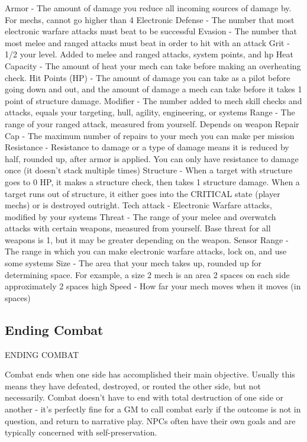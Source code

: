 Armor - The amount of damage you reduce all incoming sources of damage by. For mechs,  
cannot go higher than 4  
Electronic Defense - The number that most electronic warfare attacks must beat to be  
successful  
Evasion - The number that most melee and ranged attacks must beat in order to hit with an  
attack  
Grit - 1/2 your level. Added to melee and ranged attacks, system points, and hp  
Heat Capacity - The amount of heat your mech can take before making an overheating check.  
Hit Points (HP) - The amount of damage you can take as a pilot before going down and out, and  
the amount of damage a mech can take before it takes 1 point of structure damage.  
Modifier - The number added to mech skill checks and attacks, equals your targeting, hull, agility,  
engineering, or systems  
Range - The range of your ranged attack, measured from yourself. Depends on weapon  
Repair Cap - The maximum number of repairs to your mech you can make per mission  
Resistance - Resistance to damage or a type of damage means it is reduced by half, rounded up,  
after armor is applied. You can only have resistance to damage once (it doesn’t stack multiple  
times)  
Structure - When a target with structure goes to 0 HP, it makes a structure check, then takes 1  
structure damage. When a target runs out of structure, it either goes into the CRITICAL state  
(player mechs) or is destroyed outright.  
Tech attack - Electronic Warfare attacks, modified by your systems  
Threat - The range of your melee and overwatch attacks with certain weapons, measured from  
yourself. Base threat for all weapons is 1, but it may be greater depending on the weapon.  
Sensor Range - The range in which you can make electronic warfare attacks, lock on, and use  
some systems  
Size - The area that your mech takes up, rounded up for determining space. For example, a size  
2 mech is an area 2 spaces on each side approximately 2 spaces high  
Speed - How far your mech moves when it moves (in spaces)  

                                                                                                              
\subsection{Ending Combat}

                                           ENDING COMBAT
 

Combat ends when one side has accomplished their main objective. Usually this means they  
have defeated, destroyed, or routed the other side, but not necessarily. Combat doesn’t have to  
end with total destruction of one side or another - it’s perfectly fine for a GM to call combat early  
if the outcome is not in question, and return to narrative play. NPCs often have their own goals  
and are typically concerned with self-preservation.